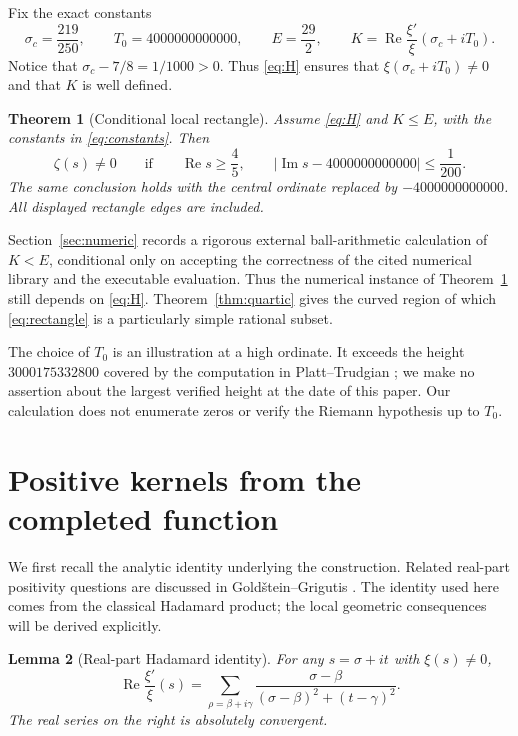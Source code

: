 \documentclass[11pt,a4paper]{article}
\newtheorem{theorem}{Theorem}[section]
\newtheorem{lemma}[theorem]{Lemma}
\theoremstyle{definition}
\newcommand{\Rea}{\operatorname{Re}}
\newcommand{\Ima}{\operatorname{Im}}
\newcommand{\scen}{\sigma_c}
\newcommand{\Tcen}{T_0}
\begin{document}
Fix the exact constants
\begin{equation}\label{eq:constants}
 \scen=\frac{219}{250},\qquad
 \Tcen=4000000000000,\qquad E=\frac{29}{2},\qquad
 K=\Rea\frac{\xi'}{\xi}(\scen+i\Tcen).
\end{equation}
Notice that $\scen-7/8=1/1000>0$. Thus \eqref{eq:H}
ensures that $\xi(\scen+i\Tcen)\ne0$ and that $K$ is well defined.

\begin{theorem}[Conditional local rectangle]\label{thm:rectangle}
Assume \eqref{eq:H} and $K\le E$, with the constants in
\eqref{eq:constants}. Then
\begin{equation}\label{eq:rectangle}
 \zeta(s)\ne0\qquad\text{if}\qquad
 \Rea s\ge\frac45,\qquad
 \left|\Ima s-4000000000000\right|\le\frac1{200}.
\end{equation}
The same conclusion holds with the central ordinate replaced by
$-4000000000000$. All displayed rectangle edges are included.
\end{theorem}

Section~\ref{sec:numeric} records a rigorous external ball-arithmetic
calculation of $K<E$, conditional only on accepting the correctness of
the cited numerical library and the executable evaluation. Thus the
numerical instance of Theorem~\ref{thm:rectangle} still depends on
\eqref{eq:H}. Theorem~\ref{thm:quartic} gives the curved region of which
\eqref{eq:rectangle} is a particularly simple rational subset.

The choice of $\Tcen$ is an illustration at a high ordinate. It exceeds
the height $3000175332800$ covered by the computation in
Platt--Trudgian \cite{PlattTrudgian}; we make no assertion about the
largest verified height at the date of this paper. Our calculation does
not enumerate zeros or verify the Riemann hypothesis up to $\Tcen$.

\section{Positive kernels from the completed function}
\label{sec:kernel}

We first recall the analytic identity underlying the construction.
Related real-part positivity questions are discussed in
Gold\v{s}tein--Grigutis \cite{GoldsteinGrigutis}. The identity used here
comes from the classical Hadamard product; the local geometric
consequences will be derived explicitly.

\begin{lemma}[Real-part Hadamard identity]\label{lem:hadamard}
For any $s=\sigma+it$ with $\xi(s)\ne0$,
\begin{equation}\label{eq:hadamard}
 \Rea\frac{\xi'}{\xi}(s)
 =\sum_{\rho=\beta+i\gamma}
 \frac{\sigma-\beta}{(\sigma-\beta)^2+(t-\gamma)^2}.
\end{equation}
The real series on the right is absolutely convergent.
\end{lemma}
\end{document}
